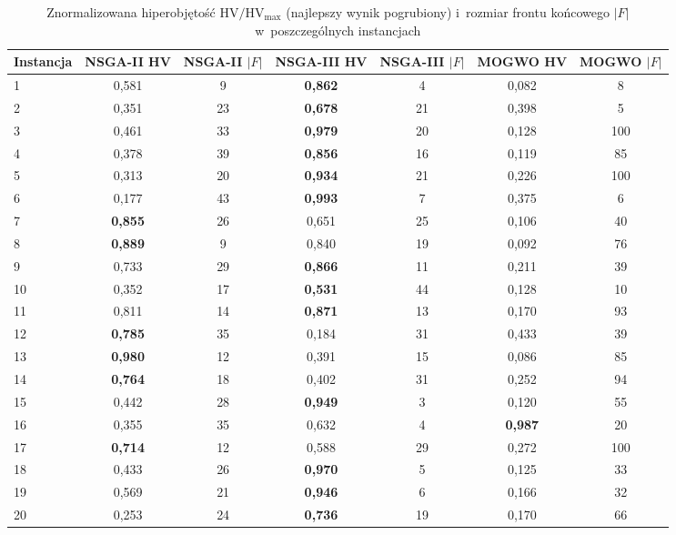 \begin{table}[htbp]
    \centering
    \caption{Znormalizowana hiperobjętość $\mathrm{HV}/\mathrm{HV}_{\max}$ (najlepszy wynik pogrubiony) i~rozmiar frontu końcowego $|F|$ w~poszczególnych instancjach}
    \label{tab:per_run}
    \begin{tabular}{l c c c c c c}
        \hline
        Instancja & NSGA-II HV & NSGA-II $|F|$ & NSGA-III HV & NSGA-III $|F|$ & MOGWO HV & MOGWO $|F|$ \\
        \hline
        1 & 0{,}581 & 9 & \textbf{0{,}862} & 4 & 0{,}082 & 8 \\
        2 & 0{,}351 & 23 & \textbf{0{,}678} & 21 & 0{,}398 & 5 \\
        3 & 0{,}461 & 33 & \textbf{0{,}979} & 20 & 0{,}128 & 100 \\
        4 & 0{,}378 & 39 & \textbf{0{,}856} & 16 & 0{,}119 & 85 \\
        5 & 0{,}313 & 20 & \textbf{0{,}934} & 21 & 0{,}226 & 100 \\
        6 & 0{,}177 & 43 & \textbf{0{,}993} & 7 & 0{,}375 & 6 \\
        7 & \textbf{0{,}855} & 26 & 0{,}651 & 25 & 0{,}106 & 40 \\
        8 & \textbf{0{,}889} & 9 & 0{,}840 & 19 & 0{,}092 & 76 \\
        9 & 0{,}733 & 29 & \textbf{0{,}866} & 11 & 0{,}211 & 39 \\
        10 & 0{,}352 & 17 & \textbf{0{,}531} & 44 & 0{,}128 & 10 \\
        11 & 0{,}811 & 14 & \textbf{0{,}871} & 13 & 0{,}170 & 93 \\
        12 & \textbf{0{,}785} & 35 & 0{,}184 & 31 & 0{,}433 & 39 \\
        13 & \textbf{0{,}980} & 12 & 0{,}391 & 15 & 0{,}086 & 85 \\
        14 & \textbf{0{,}764} & 18 & 0{,}402 & 31 & 0{,}252 & 94 \\
        15 & 0{,}442 & 28 & \textbf{0{,}949} & 3 & 0{,}120 & 55 \\
        16 & 0{,}355 & 35 & 0{,}632 & 4 & \textbf{0{,}987} & 20 \\
        17 & \textbf{0{,}714} & 12 & 0{,}588 & 29 & 0{,}272 & 100 \\
        18 & 0{,}433 & 26 & \textbf{0{,}970} & 5 & 0{,}125 & 33 \\
        19 & 0{,}569 & 21 & \textbf{0{,}946} & 6 & 0{,}166 & 32 \\
        20 & 0{,}253 & 24 & \textbf{0{,}736} & 19 & 0{,}170 & 66 \\
        \hline
    \end{tabular}
\end{table}
